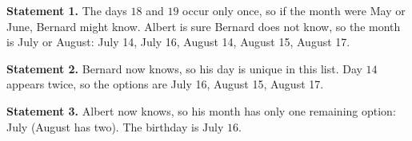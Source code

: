 \textbf{Statement 1.} The days $18$ and $19$ occur only once, so if the month were May or June, Bernard might know. Albert is sure Bernard does not know, so the month is July or August: July 14, July 16, August 14, August 15, August 17.

\textbf{Statement 2.} Bernard now knows, so his day is unique in this list. Day $14$ appears twice, so the options are July 16, August 15, August 17.

\textbf{Statement 3.} Albert now knows, so his month has only one remaining option: July (August has two). The birthday is $\boxed{\text{July 16}}$.
